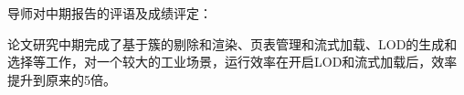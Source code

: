 \cleardoublepage{}
{
    \bfseries

    {
        \noindent 导师对中期报告的评语及成绩评定：

        \mdseries
        论文研究中期完成了基于簇的剔除和渲染、页表管理和流式加载、LOD的生成和选择等工作，对一个较大的工业场景，运行效率在开启LOD和流式加载后，效率提升到原来的5倍。
    }

    \bfseries
    \mbox{} \vfill
    \designmidcheckeval[15]
    \signature{指导教师（签名）}
}
